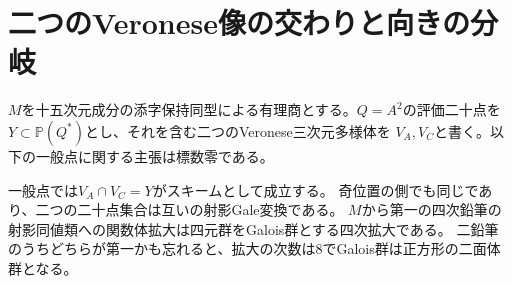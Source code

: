 \section{二つのVeronese像の交わりと向きの分岐}
\label{sec:veronese-pencil-quotient}
$M$を十五次元成分の添字保持同型による有理商とする。$Q=A^2$の評価二十点を
$Y\subset\mathbb P(Q^*)$とし、それを含む二つのVeronese三次元多様体を
$V_A,V_C$と書く。以下の一般点に関する主張は標数零である。

\begin{theorem}\label{thm:veronese-pencil-quotient}
一般点では$V_A\cap V_C=Y$がスキームとして成立する。
奇位置の側でも同じであり、二つの二十点集合は互いの射影Gale変換である。
$M$から第一の四次鉛筆の射影同値類への関数体拡大は四元群をGalois群とする四次拡大である。
二鉛筆のうちどちらが第一かも忘れると、拡大の次数は8でGalois群は正方形の二面体群となる。
\end{theorem}
